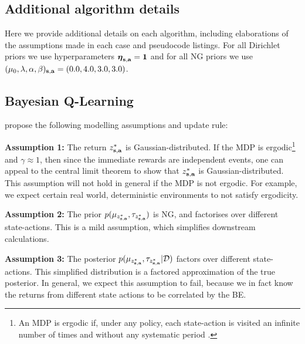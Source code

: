 \documentclass{article}
\begin{document}
\clearpage




\clearpage
\begin{appendices}
\section{Additional algorithm details}

Here we provide additional details on each algorithm, including elaborations of the assumptions made in each case and pseudocode listings. For all Dirichlet priors we use hyperparameters $\boldsymbol{\eta}_{\mathbf{s}, \mathbf{a}} = \mathbf{1}$ and for all NG priors we use $(\mu_0, \lambda, \alpha, \beta)_{\mathbf{s}, \mathbf{a}} = (0.0, 4.0, 3.0, 3.0)$.

\subsection{Bayesian Q-Learning} \label{app:bql}

\cite{bqlearning} propose the following modelling assumptions and update rule:

\textbf{Assumption 1:} The return $z^*_{\mathbf{s}, \mathbf{a}}$ is Gaussian-distributed. If the MDP is ergodic\footnote{An MDP is ergodic if, under any policy, each state-action is visited an infinite number of times and without any systematic period \citep{silver}.} and $\gamma \approx 1$, then since the immediate rewards are independent events, one can appeal to the central limit theorem to show that $z^*_{\mathbf{s}, \mathbf{a}}$ is Gaussian-distributed. This assumption will not hold in general if the MDP is not ergodic. For example, we expect certain real world, deterministic environments to not satisfy ergodicity.

\textbf{Assumption 2:} The prior $p(\mu_{z^*_{\mathbf{s}, \mathbf{a}}}, \tau_{z^*_{\mathbf{s}, \mathbf{a}}})$ is NG, and factorises over different state-actions. This is a mild assumption, which simplifies downstream calculations.

\textbf{Assumption 3:} The posterior $p(\mu_{z^*_{\mathbf{s}, \mathbf{a}}}, \tau_{z^*_{\mathbf{s}, \mathbf{a}}}| \mathcal{D})$ factors over different state-actions. This simplified distribution is a factored approximation of the true posterior. In general, we expect this assumption to fail, because we in fact know the returns from different state actions to be correlated by the BE.


\end{appendices}
\end{document}
